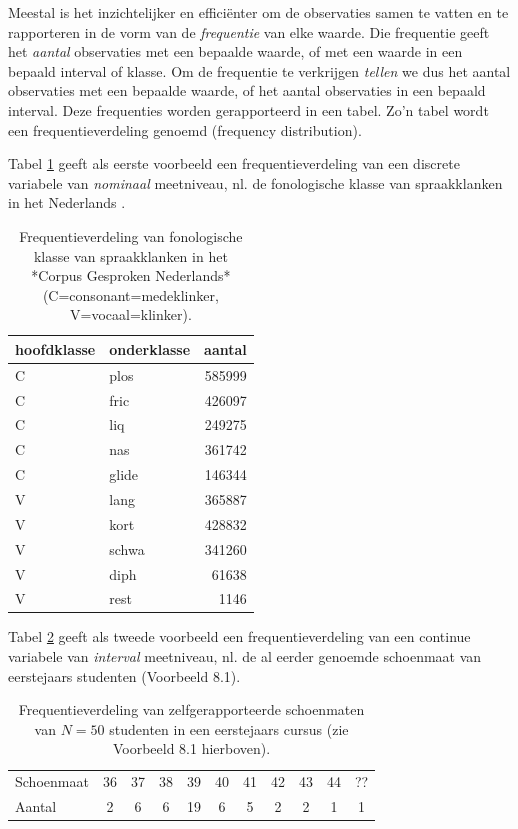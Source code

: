 \documentclass[
]{book}
\begin{document}
Meestal is het inzichtelijker en efficiënter om de observaties samen te
vatten en te rapporteren in de vorm van de \emph{frequentie} van elke waarde.
Die frequentie geeft het \emph{aantal} observaties met een bepaalde waarde,
of met een waarde in een bepaald interval of klasse. Om de frequentie te
verkrijgen \emph{tellen} we dus het aantal observaties met een bepaalde
waarde, of het aantal observaties in een bepaald interval. Deze
frequenties worden gerapporteerd in een tabel. Zo'n tabel wordt een
frequentieverdeling genoemd (frequency distribution).

Tabel \ref{tab:klankfreq} geeft als eerste voorbeeld een
frequentieverdeling van een discrete variabele van \emph{nominaal}
meetniveau, nl. de fonologische klasse van spraakklanken in het
Nederlands \citep{LKCG07}.

\begin{table}

\caption{\label{tab:klankfreq}Frequentieverdeling 
              van fonologische klasse van spraakklanken 
              in het *Corpus Gesproken Nederlands* 
              (C=consonant=medeklinker, V=vocaal=klinker).}
\centering
\begin{tabular}[t]{llr}
\toprule
hoofdklasse & onderklasse & aantal\\
\midrule
C & plos & 585999\\
C & fric & 426097\\
C & liq & 249275\\
C & nas & 361742\\
C & glide & 146344\\
\addlinespace
V & lang & 365887\\
V & kort & 428832\\
V & schwa & 341260\\
V & diph & 61638\\
V & rest & 1146\\
\bottomrule
\end{tabular}
\end{table}

Tabel \ref{tab:schoenmaat} geeft als tweede voorbeeld een
frequentieverdeling van een continue variabele van \emph{interval}
meetniveau, nl. de al eerder genoemde schoenmaat van eerstejaars
studenten (Voorbeeld 8.1).

\begin{longtable}[]{@{}lcccccccccc@{}}
\caption{\label{tab:schoenmaat} Frequentieverdeling van zelfgerapporteerde schoenmaten
van \(N=50\) studenten in een eerstejaars cursus (zie
Voorbeeld 8.1 hierboven).}\tabularnewline
\toprule
\endhead
Schoenmaat & 36 & 37 & 38 & 39 & 40 & 41 & 42 & 43 & 44 & ??\tabularnewline
Aantal & 2 & 6 & 6 & 19 & 6 & 5 & 2 & 2 & 1 & 1\tabularnewline
\bottomrule
\end{longtable}
\end{document}
